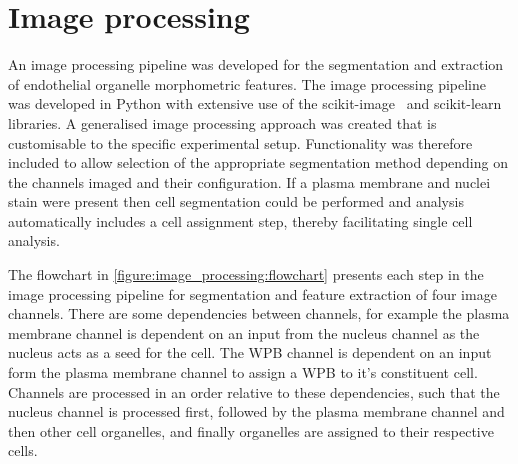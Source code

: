 \section{Image processing}
\label{endothelial_morphometry:image_processing}
An image processing pipeline was developed for the segmentation and extraction of endothelial organelle morphometric features. The image processing pipeline was developed in Python with extensive use of the scikit-image~\cite{VanderWalt2014} and scikit-learn~\cite{Pedregosa2011} libraries. A generalised image processing approach was created that is customisable to the specific experimental setup. Functionality was therefore included to allow selection of the appropriate segmentation method depending on the channels imaged and their configuration. If a plasma membrane and nuclei stain were present then cell segmentation could be performed and analysis automatically includes a cell assignment step, thereby facilitating single cell analysis.

The flowchart in \autoref{figure:image_processing:flowchart} presents each step in the image processing pipeline for segmentation and feature extraction of four image channels. There are some dependencies between channels, for example the plasma membrane channel is dependent on an input from the nucleus channel as the nucleus acts as a seed for the cell. The WPB channel is dependent on an input form the plasma membrane channel to assign a WPB to it's constituent cell. Channels are processed in an order relative to these dependencies, such that the nucleus channel is processed first, followed by the plasma membrane channel and then other cell organelles, and finally organelles are assigned to their respective cells.


